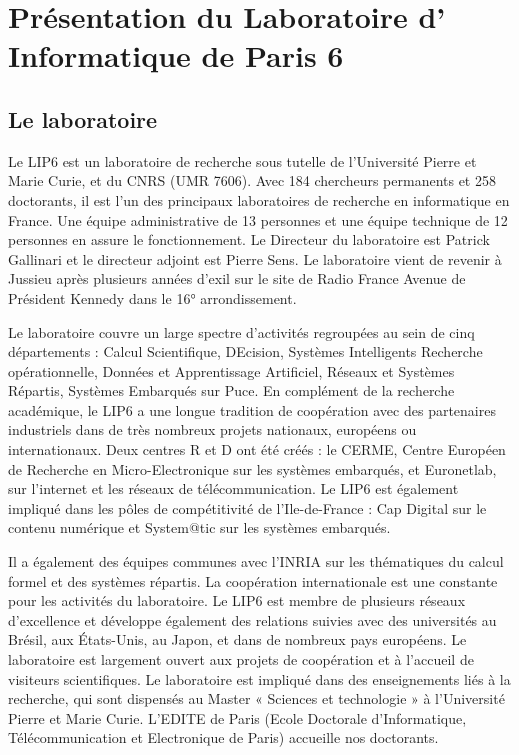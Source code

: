 \section{Présentation du Laboratoire d' Informatique de Paris 6}
	\subsection{Le laboratoire}
	Le LIP6 est un laboratoire de recherche sous tutelle de l'Université Pierre et Marie Curie, et du CNRS (UMR 7606). Avec 184 chercheurs permanents et 258 doctorants, il est l'un des principaux laboratoires de recherche en informatique en France. Une équipe administrative de 13 personnes et une équipe technique de 12 personnes en assure le fonctionnement. Le Directeur du laboratoire est Patrick Gallinari et le directeur adjoint est Pierre Sens. Le laboratoire vient de revenir à Jussieu après plusieurs années d'exil sur le site de Radio France Avenue de Président Kennedy dans le 16° arrondissement.

Le laboratoire couvre un large spectre d'activités regroupées au sein de cinq départements : Calcul Scientifique, DEcision, Systèmes Intelligents Recherche opérationnelle, Données et Apprentissage Artificiel, Réseaux et Systèmes Répartis, Systèmes Embarqués sur Puce. En complément de la recherche académique, le LIP6 a une longue tradition de coopération avec des partenaires industriels dans de très nombreux projets nationaux, européens ou internationaux. Deux centres R et D ont été créés : le CERME, Centre Européen de Recherche en Micro-Electronique sur les systèmes embarqués, et Euronetlab, sur l'internet et les réseaux de télécommunication. Le LIP6 est également impliqué dans les pôles de compétitivité de l'Ile-de-France : Cap Digital sur le contenu numérique et System@tic sur les systèmes embarqués.

Il a également des équipes communes avec l'INRIA sur les thématiques du calcul formel et des systèmes répartis. La coopération internationale est une constante pour les activités du laboratoire. Le LIP6 est membre de plusieurs réseaux d'excellence et développe également des relations suivies avec des universités au Brésil, aux États-Unis, au Japon, et dans de nombreux pays européens. Le laboratoire est largement ouvert aux projets de coopération et à l'accueil de visiteurs scientifiques. Le laboratoire est impliqué dans des enseignements liés à la recherche, qui sont dispensés au Master « Sciences et technologie » à l'Université Pierre et Marie Curie. L'EDITE de Paris (Ecole Doctorale d'Informatique, Télécommunication et Electronique de Paris) accueille nos doctorants.


